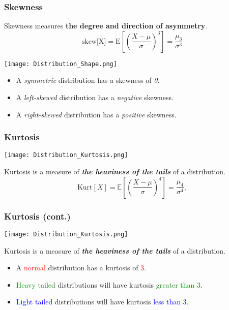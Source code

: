 \documentclass[11pt, xcolor=x11names,compress]{beamer}
\begin{document}
\begin{frame}[fragile,t]
\frametitle{Skewness}
Skewness measures \textbf{the degree and direction of asymmetry}.
\begin{equation*}
\text{skew[X]} =\mathrm{E}\left[\left(\frac{X-\mu}{\sigma}\right)^{3}\right]=\frac{\mu_{3}}{\sigma^{3}}
\end{equation*}
\begin{center}
    \texttt{[image: Distribution\_Shape.png]}
\end{center}

\begin{itemize}
    \item A \textit{symmetric} distribution has a skewness of \textit{0}. 
    \item A \textit{left-skewed} distribution has a \textit{negative} skewness.
    \item A \textit{right-skewed} distribution has a \textit{positive} skewness.
\end{itemize}
\hyperlink{a1)}{}
\end{frame}

\begin{frame}[fragile,t]
\frametitle{Kurtosis}
\begin{center}
        \texttt{[image: Distribution\_Kurtosis.png]}
\end{center}
Kurtosis is a measure of \textit{\textbf{the heaviness of the tails}} of a distribution. 
\begin{equation*}
\text{Kurt}[X]=\mathds{E}\left[\left(\frac{X-\mu}{\sigma}\right)^{4}\right]=\frac{\mu_{4}}{\sigma^{4}},
\end{equation*}
\hyperlink{a1)}{}
\end{frame}

\begin{frame}[fragile,t]
\frametitle{Kurtosis (cont.)}
\begin{center}
        \texttt{[image: Distribution\_Kurtosis.png]}
\end{center}
Kurtosis is a measure of \textit{\textbf{the heaviness of the tails}} of a distribution. 
\begin{itemize}
    \item A \textcolor{red}{normal} distribution has a kurtosis of \textcolor{red}{3}.
    \item \textcolor{green}{Heavy tailed} distributions will have kurtosis \textcolor{green}{greater than 3}.
    \item \textcolor{blue}{Light tailed} distributions will have kurtosis \textcolor{blue}{less than 3}.
\end{itemize}
\hyperlink{a1)}{}
\end{frame}
\end{document}
